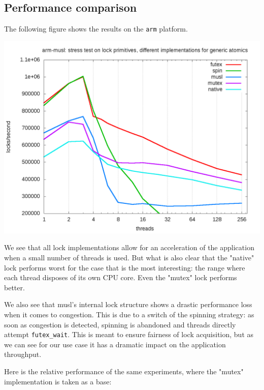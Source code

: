 \documentclass{sig-alternate-05-2015}
\begin{document}
\subsection{Performance comparison}
\label{sec-4-4}

The following figure shows the results on the \texttt{arm}
platform.\vspace*{-2ex}


\begin{center}
\includegraphics[width=0.95\linewidth]{benchs/arm/test-arm-u64.png}
\end{center}

\vspace*{-2ex}
We see that all lock implementations allow for an acceleration of
the application when a small number of threads is used. But what is
also clear that the "native" lock performs worst for the case that
is the most interesting: the range where each thread disposes of
its own CPU core. Even the "mutex" lock performs better.

We also see that musl's internal lock structure shows a drastic
performance loss when it comes to congestion. This is due to a
switch of the spinning strategy: as soon as congestion is detected,
spinning is abandoned and threads directly attempt
\texttt{futex\_wait}. This is meant to ensure fairness of lock acquisition,
but as we can see for our use case it has a dramatic impact on the
application throughput.

Here is the relative performance of the same experiments, where the
"mutex" implementation is taken as a base:
\end{document}
